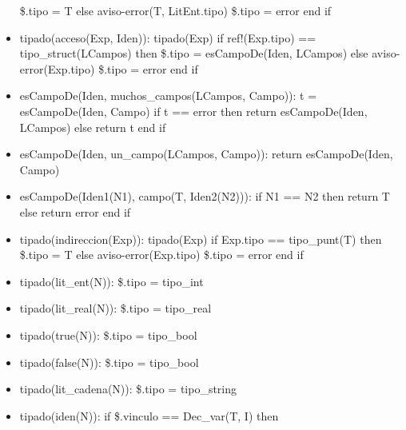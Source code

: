 \documentclass[11pt]{article}
\begin{document}
\begin{itemize}
                    \subsubitem \$.tipo = T
                \subitem else 
                    \subsubitem aviso-error(T, LitEnt.tipo)
                    \subsubitem \$.tipo = error
                \subitem end if
            \item tipado(acceso(Exp, Iden)): 
                \subitem tipado(Exp) 
                \subitem if ref!(Exp.tipo) == tipo\_struct(LCampos) then
                    \subsubitem \$.tipo = esCampoDe(Iden, LCampos)
                \subitem else 
                    \subsubitem aviso-error(Exp.tipo)
                    \subsubitem \$.tipo = error
                \subitem end if
            \item esCampoDe(Iden, muchos\_campos(LCampos, Campo)): 
                \subitem t = esCampoDe(Iden, Campo) 
                \subitem if t == error then
                    \subsubitem return esCampoDe(Iden, LCampos)
                \subitem else 
                    \subsubitem return t
                \subitem end if
            \item esCampoDe(Iden, un\_campo(LCampos, Campo)): 
                \subitem return esCampoDe(Iden, Campo)
            \item esCampoDe(Iden1(N1), campo(T, Iden2(N2))): 
                \subitem if N1 == N2 then
                    \subsubitem return T
                \subitem else 
                    \subsubitem return error
                \subitem end if
            \item tipado(indireccion(Exp)): 
                \subitem tipado(Exp) 
                \subitem if Exp.tipo == tipo\_punt(T) then
                    \subsubitem \$.tipo = T
                \subitem else 
                    \subsubitem aviso-error(Exp.tipo)
                    \subsubitem \$.tipo = error
                \subitem end if
            \item tipado(lit\_ent(N)): 
                \subitem \$.tipo = tipo\_int
            \item tipado(lit\_real(N)): 
                \subitem \$.tipo = tipo\_real
            \item tipado(true(N)): 
                \subitem \$.tipo = tipo\_bool
            \item tipado(false(N)): 
                \subitem \$.tipo = tipo\_bool
            \item tipado(lit\_cadena(N)): 
                \subitem \$.tipo = tipo\_string
            \item tipado(iden(N)): 
                \subitem if \$.vinculo == Dec\_var(T, I) then

\end{itemize}
\end{document}
